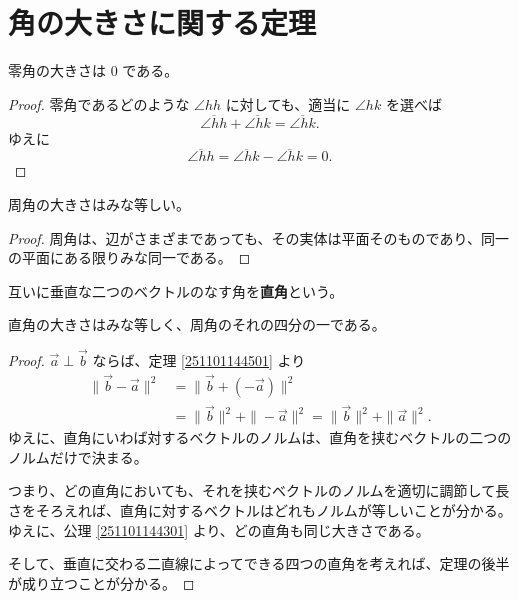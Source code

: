 \chapter{角の大きさに関する定理}

\begin{thm}\label{260112114001}
  零角の大きさは \(0\) である。
\end{thm}

\begin{proof}
  零角であるどのような \(\angle hh\) に対しても、適当に \(\angle hk\) を選べば
  \[\overline{\angle hh}+\overline{\angle hk}=\overline{\angle hk}.\]
  ゆえに
  \[\overline{\angle hh}=\overline{\angle hk}-\overline{\angle hk}=0.\]
\end{proof}

\begin{thm}
  周角の大きさはみな等しい。
\end{thm}

\begin{proof}
  周角は、辺がさまざまであっても、その実体は平面そのものであり、同一の平面にある限りみな同一である。
\end{proof}

\begin{dfn}[直角]
  互いに垂直な二つのベクトルのなす角を\textbf{直角}という。
\end{dfn}

\begin{thm}
  直角の大きさはみな等しく、周角のそれの四分の一である。
\end{thm}

\begin{proof}
  \(\vec{a}\perp\vec{b}\) ならば、定理 \ref{251101144501} より
  \begin{align*}
    \|\vec{b}-\vec{a}\|^2 &= \|\vec{b}+(-\vec{a})\|^2 \\
                          &= \|\vec{b}\|^2+\|-\vec{a}\|^2= \|\vec{b}\|^2+\|\vec{a}\|^2.
  \end{align*}
  ゆえに、直角にいわば対するベクトルのノルムは、直角を挟むベクトルの二つのノルムだけで決まる。

  つまり、どの直角においても、それを挟むベクトルのノルムを適切に調節して長さをそろえれば、直角に対するベクトルはどれもノルムが等しいことが分かる。
  ゆえに、公理 \ref{251101144301} より、どの直角も同じ大きさである。

  そして、垂直に交わる二直線によってできる四つの直角を考えれば、定理の後半が成り立つことが分かる。
\end{proof}

